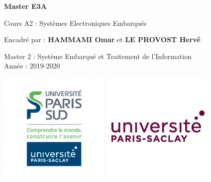 \begin{titlepage}
\begin{center}
\vspace*{1cm}

\textbf{Master E3A}

\vspace{0.5cm}


Cours A2 : Systèmes Electroniques Embarqués

\vspace{1.5cm}
\mytitle

\vspace{1.5cm}
\theauthor

\vspace{1.5cm}
Encadré par :
\textbf{HAMMAMI Omar} et \textbf{LE PROVOST Hervé}
\vfill

Master 2 : Système Embarqué et Traitement de l'Information\\
\vspace{0.8cm}
Année : 2019-2020
\vspace{0.8cm}
\begin{center}
	\includegraphics[width=0.4\textwidth]{logo}
	\includegraphics[width=0.4\textwidth]{logo2}
\end{center}


\end{center}
\end{titlepage}
